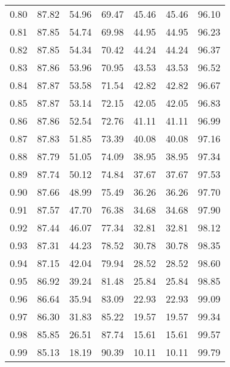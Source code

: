 \begin{tabular}{|c|c|c|c|c|c|c|}
      0.80 &     87.82 &     54.96 &      69.47 &   45.46 &      45.46 &         96.10 \\
      0.81 &     87.85 &     54.74 &      69.98 &   44.95 &      44.95 &         96.23 \\
      0.82 &     87.85 &     54.34 &      70.42 &   44.24 &      44.24 &         96.37 \\
      0.83 &     87.86 &     53.96 &      70.95 &   43.53 &      43.53 &         96.52 \\
      0.84 &     87.87 &     53.58 &      71.54 &   42.82 &      42.82 &         96.67 \\
      0.85 &     87.87 &     53.14 &      72.15 &   42.05 &      42.05 &         96.83 \\
      0.86 &     87.86 &     52.54 &      72.76 &   41.11 &      41.11 &         96.99 \\
      0.87 &     87.83 &     51.85 &      73.39 &   40.08 &      40.08 &         97.16 \\
      0.88 &     87.79 &     51.05 &      74.09 &   38.95 &      38.95 &         97.34 \\
      0.89 &     87.74 &     50.12 &      74.84 &   37.67 &      37.67 &         97.53 \\
      0.90 &     87.66 &     48.99 &      75.49 &   36.26 &      36.26 &         97.70 \\
      0.91 &     87.57 &     47.70 &      76.38 &   34.68 &      34.68 &         97.90 \\
      0.92 &     87.44 &     46.07 &      77.34 &   32.81 &      32.81 &         98.12 \\
      0.93 &     87.31 &     44.23 &      78.52 &   30.78 &      30.78 &         98.35 \\
      0.94 &     87.15 &     42.04 &      79.94 &   28.52 &      28.52 &         98.60 \\
      0.95 &     86.92 &     39.24 &      81.48 &   25.84 &      25.84 &         98.85 \\
      0.96 &     86.64 &     35.94 &      83.09 &   22.93 &      22.93 &         99.09 \\
      0.97 &     86.30 &     31.83 &      85.22 &   19.57 &      19.57 &         99.34 \\
      0.98 &     85.85 &     26.51 &      87.74 &   15.61 &      15.61 &         99.57 \\
      0.99 &     85.13 &     18.19 &      90.39 &   10.11 &      10.11 &         99.79 \\
\bottomrule
\end{tabular}
